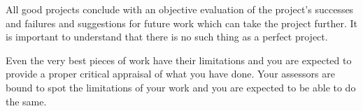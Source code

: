 \label{Conclusions} %




All good projects conclude with an objective evaluation of the project's successes and failures and suggestions for future work which can take the project further. It is important to understand that there is no such thing as a perfect project. 

Even the very best pieces of work have their limitations and you are expected to provide a proper critical appraisal of what you have done. Your assessors are bound to spot the limitations of your work and you are expected to be able to do the same.
